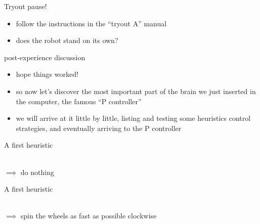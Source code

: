 \begin{frame}{Tryout pause!}
	\begin{itemize}
		\item follow the instructions in the ``tryout A'' manual
		\item does the robot stand on its own?
	\end{itemize}
\end{frame}


\begin{frame}{post-experience discussion}
	\begin{itemize}
		\item hope things worked!
		\item so now let's discover the most important part of the brain we just inserted in the computer, the famous ``P controller''
		\item we will arrive at it little by little, listing and testing some heuristics control strategies, and eventually arriving to the P controller
	\end{itemize}
\end{frame}


\begin{frame}{A first heuristic}
	\pause
	\begin{center}
		 \\
		$\implies$ do nothing
	\end{center}
\end{frame}


\begin{frame}{A first heuristic}
	\begin{center}
		 \\
		$\implies$ spin the wheels as fast as possible clockwise
	\end{center}
\end{frame}


